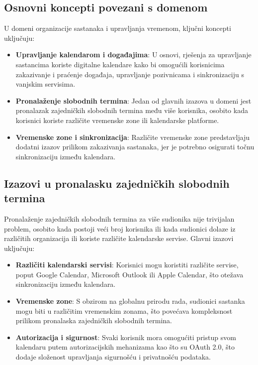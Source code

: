 \documentclass{foi}
\begin{document}
\subsection{Osnovni koncepti povezani s domenom}

U domeni organizacije sastanaka i upravljanja vremenom, ključni koncepti uključuju:

\begin{itemize}
    \item \textbf{Upravljanje kalendarom i događajima}: U osnovi, rješenja za upravljanje sastancima koriste digitalne kalendare kako bi omogućili korisnicima zakazivanje i praćenje događaja, upravljanje pozivnicama i sinkronizaciju s vanjskim servisima.
    \item \textbf{Pronalaženje slobodnih termina}: Jedan od glavnih izazova u domeni jest pronalazak zajedničkih slobodnih termina među više korisnika, osobito kada korisnici koriste različite vremenske zone ili kalendarske platforme.
    \item \textbf{Vremenske zone i sinkronizacija}: Različite vremenske zone predstavljaju dodatni izazov prilikom zakazivanja sastanaka, jer je potrebno osigurati točnu sinkronizaciju između kalendara.
\end{itemize}

\subsection{Izazovi u pronalasku zajedničkih slobodnih termina}

Pronalaženje zajedničkih slobodnih termina za više sudionika nije trivijalan problem, osobito kada postoji veći broj korisnika ili kada sudionici dolaze iz različitih organizacija ili koriste različite kalendarske servise. Glavni izazovi uključuju:

\begin{itemize}
    \item \textbf{Različiti kalendarski servisi}: Korisnici mogu koristiti različite servise, poput Google Calendar, Microsoft Outlook ili Apple Calendar, što otežava sinkronizaciju između kalendara.
    \item \textbf{Vremenske zone}: S obzirom na globalnu prirodu rada, sudionici sastanka mogu biti u različitim vremenskim zonama, što povećava kompleksnost prilikom pronalaska zajedničkih slobodnih termina.
    \item \textbf{Autorizacija i sigurnost}: Svaki korisnik mora omogućiti pristup svom kalendaru putem autorizacijskih mehanizama kao što su OAuth 2.0, što dodaje složenost upravljanja sigurnošću i privatnošću podataka.
\end{itemize}
\end{document}
